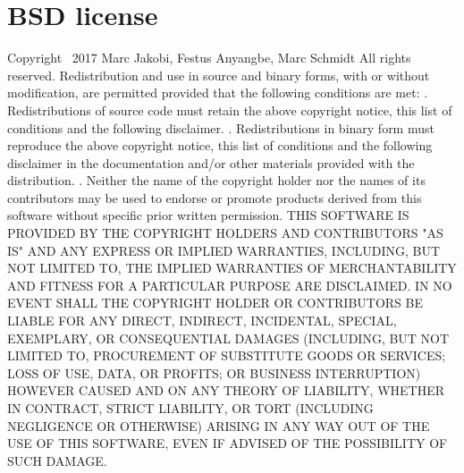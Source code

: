 \section*{BSD license}
Copyright \textcopyright\ 2017 Marc Jakobi, Festus Anyangbe, Marc Schmidt\newline
All rights reserved.
\newline
\newline
Redistribution and use in source and binary forms, with or without modification, are permitted provided that the following conditions are met:
\newline{}. Redistributions of source code must retain the above copyright notice, this list of conditions and the following disclaimer.
\newline{}. Redistributions in binary form must reproduce the above copyright notice, this list of conditions and the following disclaimer in the documentation and/or other materials provided with the distribution.
\newline{}. Neither the name of the copyright holder nor the names of its contributors may be used to endorse or promote products derived from this software without specific prior written permission.
\newline\newline
THIS SOFTWARE IS PROVIDED BY THE COPYRIGHT HOLDERS AND CONTRIBUTORS "AS IS" AND ANY EXPRESS OR IMPLIED WARRANTIES, INCLUDING, BUT NOT LIMITED TO, THE IMPLIED WARRANTIES OF MERCHANTABILITY AND FITNESS FOR A PARTICULAR PURPOSE ARE DISCLAIMED. IN NO EVENT SHALL THE COPYRIGHT HOLDER OR CONTRIBUTORS BE LIABLE FOR ANY DIRECT, INDIRECT, INCIDENTAL, SPECIAL, EXEMPLARY, OR CONSEQUENTIAL
DAMAGES (INCLUDING, BUT NOT LIMITED TO, PROCUREMENT OF SUBSTITUTE GOODS OR SERVICES; LOSS OF USE, DATA, OR PROFITS; OR BUSINESS INTERRUPTION) HOWEVER CAUSED AND ON ANY THEORY OF LIABILITY, WHETHER IN CONTRACT, STRICT LIABILITY, OR TORT (INCLUDING NEGLIGENCE OR OTHERWISE) ARISING IN ANY WAY OUT OF THE USE OF THIS SOFTWARE, EVEN IF ADVISED OF THE POSSIBILITY OF SUCH DAMAGE.
